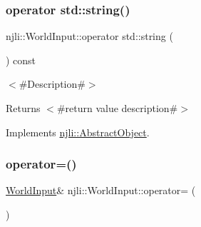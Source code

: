 \mbox{\label{classnjli_1_1_world_input_a69448c86610047b676f79439d7e57662}} 
\subsubsection{\texorpdfstring{operator std\+::string()}{operator std::string()}}
{\footnotesize\ttfamily njli\+::\+World\+Input\+::operator std\+::string (\begin{DoxyParamCaption}{ }\end{DoxyParamCaption}) const\hspace{0.3cm}{\ttfamily [virtual]}}

$<$\#\+Description\#$>$

\begin{DoxyReturn}{Returns}
$<$\#return value description\#$>$ 
\end{DoxyReturn}


Implements \mbox{\hyperlink{classnjli_1_1_abstract_object_afc07f4138bd3003910e7aa7fa0fe11ad}{njli\+::\+Abstract\+Object}}.

\mbox{\label{classnjli_1_1_world_input_a2264836ad331a16cd3a729f3979020fb}} 
\subsubsection{\texorpdfstring{operator=()}{operator=()}}
{\footnotesize\ttfamily \mbox{\hyperlink{classnjli_1_1_world_input}{World\+Input}}\& njli\+::\+World\+Input\+::operator= (\begin{DoxyParamCaption}\item[{const \mbox{\hyperlink{classnjli_1_1_world_input}{World\+Input}} \&}]{ }\end{DoxyParamCaption})\hspace{0.3cm}{\ttfamily [private]}}

\mbox{\label{classnjli_1_1_world_input_aa8e794dd446367b3130469c0a79a5e1d}} 
